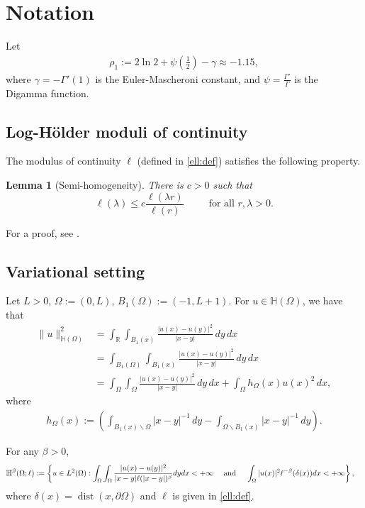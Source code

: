 \documentclass[10 pt]{article}
\newtheorem{lemma}[theorem]{Lemma}
\numberwithin{equation}{section}
\newcommand{\weH}[1]{\mathbb H^{#1}(\Omega;\ell)}
\def\R{\mathbb{R}}
\def\mH{\mathbb{H}}
\begin{document}
\section{Notation} \label{sec:notation}

Let
\begin{align}\label{constants}
\rho_1:=2\ln 2 + \psi(\tfrac{1}{2})-\gamma\approx -1.15,
\end{align}
where $\gamma=-\Gamma'(1)$ is the Euler-Mascheroni constant, and $\psi=\frac{\Gamma'}{\Gamma}$ is the Digamma function.

\subsection{Log-Hölder moduli of continuity}

The modulus of continuity $\ell$ (defined in \eqref{ell:def}) satisfies the following property.

\begin{lemma}[Semi-homogeneity]\label{prop1}
There is $c>0$ such that 
\[
\ell(\lambda)\leq c\frac{\ell(\lambda r)}{\ell(r)}\,\qquad \text{ for all }r,\lambda >0.
\]
\end{lemma}
For a proof, see \cite[Lemma 3.2]{CS22}.

\subsection{Variational setting}
Let $L>0$, $\Omega:=(0,L)$, $B_1(\Omega):=(-1,L+1)$. For $u\in \mH(\Omega)$, we have that
\begin{align*}
    \|u\|^2_{\mathbb H(\Omega)}&=\int_{\R}\int_{B_1(x)}\frac{|u(x)-u(y)|^2}{|x-y|}\, dy\, dx\\
    &=\int_{B_1(\Omega)}\int_{B_1(x)}\frac{|u(x)-u(y)|^2}{|x-y|}\, dy\, dx\\
    &=\int_\Omega\int_\Omega \frac{|u(x)-u(y)|^2}{|x-y|}\, dy\, dx+\int_{\Omega}h_\Omega(x)u(x)^2\, dx,
\end{align*}
where
\begin{align*}
    h_\Omega(x):=\left(\int_{B_1(x)\backslash \Omega}|x-y|^{-1}\, dy - \int_{\Omega\backslash B_1(x)}|x-y|^{-1}\, dy\right).
\end{align*}


For any $\beta>0$,
%
\begin{align}\notag
    \weH{\beta}&:=\left\{ u\in L^2(\Omega): \int_{\Omega}\int_{\Omega}\frac{|u(x)-u(y)|^2}{|x-y|\ell(|x-y|)^{\beta}}dydx<+\infty \quad\textnormal{ and }\quad  \int_{\Omega}|u(x)|^2\ell^{-\beta}(\delta(x))dx <+\infty\right\},\label{H:weights:def}
\end{align}
where $\delta(x)=\operatorname{dist}(x,\partial \Omega)$ and $\ell$ is given in \eqref{ell:def}. 
\end{document}
